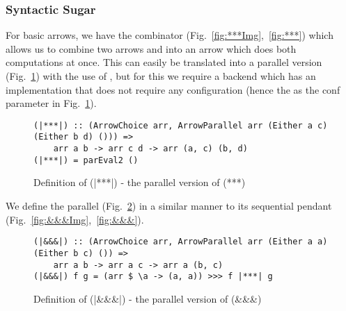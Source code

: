 \subsubsection{Syntactic Sugar} \label{syntacticSugar}
For basic arrows, we have the \code{(***)} combinator (Fig.~\ref{fig:***Img},~\ref{fig:***}) which allows us to combine two arrows  and  into an arrow  which does both computations at once. This can easily be translated into a parallel version \code{(|***|)} (Fig.~\ref{fig:|***|}) with the use of , but for this we require a backend which has an implementation that does not require any configuration (hence the \code{()} as the conf parameter in Fig.~\ref{fig:|***|}).
\begin{figure}[h]
\begin{lstlisting}[frame=htrbl]
(|***|) :: (ArrowChoice arr, ArrowParallel arr (Either a c) (Either b d) ())) =>
	arr a b -> arr c d -> arr (a, c) (b, d)
(|***|) = parEval2 ()
\end{lstlisting}
\caption{Definition of (|***|) - the parallel version of (***)}
\label{fig:|***|}
\end{figure}
We define the parallel \code{(|\&\&\&|)} (Fig.~\ref{fig:|&&&|}) in a similar manner to its sequential pendant \code{(\&\&\&)} (Fig.~\ref{fig:&&&Img},~\ref{fig:&&&}).
\begin{figure}[h]
\begin{lstlisting}[frame=htrbl]
(|&&&|) :: (ArrowChoice arr, ArrowParallel arr (Either a a) (Either b c) ()) =>
	arr a b -> arr a c -> arr a (b, c)
(|&&&|) f g = (arr $ \a -> (a, a)) >>> f |***| g
\end{lstlisting} %
\caption{Definition of (|\&\&\&|) - the parallel version of (\&\&\&)}
\label{fig:|&&&|}
\end{figure}